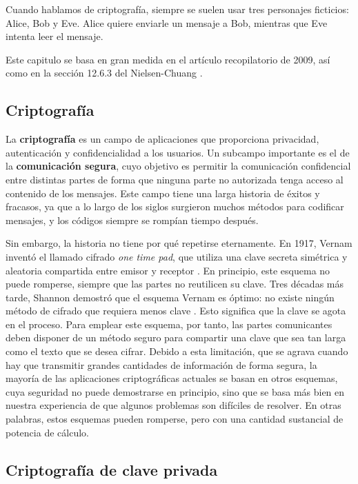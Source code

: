 \documentclass[a4paper,11pt]{book} %
\numberwithin{equation}{chapter}
\begin{document}
Cuando hablamos de criptografía, siempre se suelen usar tres personajes ficticios: Alice, Bob y Eve. Alice quiere enviarle un mensaje a Bob, mientras que Eve intenta leer el mensaje. 

Este capitulo se basa en gran medida en el artículo recopilatorio \cite{bib_QKD_resumen} de 2009, así como en la sección 12.6.3 del Nielsen-Chuang \cite{bib_nielsen_chuang_2010}.

	\subsection{Criptografía}
	
	La \textbf{criptografía} es un campo de aplicaciones que proporciona privacidad, autenticación y confidencialidad a los usuarios. Un subcampo importante es el de la \textbf{comunicación segura}, cuyo objetivo es permitir la comunicación confidencial entre distintas partes de forma que ninguna parte no autorizada tenga acceso al contenido de los mensajes. Este campo tiene una larga historia de éxitos y fracasos, ya que a lo largo de los siglos surgieron muchos métodos para codificar mensajes, y los códigos siempre se rompían tiempo después.

Sin embargo, la historia no tiene por qué repetirse eternamente. En 1917, Vernam inventó el llamado cifrado \textit{one time pad}, que utiliza una clave secreta simétrica y aleatoria compartida entre emisor y receptor \cite{bib_Vernam-1926}. En principio, este esquema no puede romperse, siempre que las partes no reutilicen su clave. Tres décadas más tarde, Shannon demostró que el esquema Vernam es óptimo: no existe ningún método de cifrado que requiera menos clave \cite{bib_Shannon-1949}. Esto significa que la clave se agota en el proceso. Para emplear este esquema, por tanto, las partes comunicantes deben disponer de un método seguro para compartir una clave que sea tan larga como el texto que se desea cifrar. Debido a esta limitación, que se agrava cuando hay que transmitir grandes cantidades de información de forma segura, la mayoría de las aplicaciones criptográficas actuales se basan en otros esquemas, cuya seguridad no puede demostrarse en principio, sino que se basa más bien en nuestra experiencia de que algunos problemas son difíciles de resolver. En otras palabras, estos esquemas pueden romperse, pero con una cantidad sustancial de potencia de cálculo. 

		\subsection{Criptografía de clave privada}
	
\end{document}
